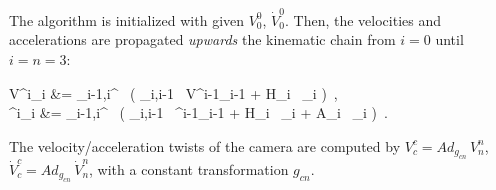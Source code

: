 \begin{algorithm}
\label{alg:forward_propagation}

The algorithm is initialized with given $V^{0}_{0}$, $\dot{V}^{0}_{0}$.
%
%
%
%
%
%
%
Then, the velocities and accelerations are propagated \textit{upwards} the kinematic chain from $i=0$ until $i=n=3$:
%
\begin{flalign}
V^{i}_{i} &= \Omega_{i-1,i}^ \, ( \Phi_{i,i-1} \, V^{i-1}_{i-1} + H_{i} \, _{i} ) \,, \label{eq:upwards_prop1} \\
%
^{i}_{i} &= \Omega_{i-1,i}^ \, ( \Phi_{i,i-1} \, ^{i-1}_{i-1} + H_{i} \, _{i} + A_{i} \, _{i} ) \,.
\label{eq:upwards_prop2}
\end{flalign}
%
%
The velocity/acceleration twists of the camera are computed by $V^c_{c} = Ad_{g_{cn}} \, V^{n}_{n}$, $\dot{V}^c_{c} = Ad_{g_{cn}} \, \dot{V}^{n}_{n}$, with a constant transformation $g_{cn}$.
%
%

\end{algorithm}
